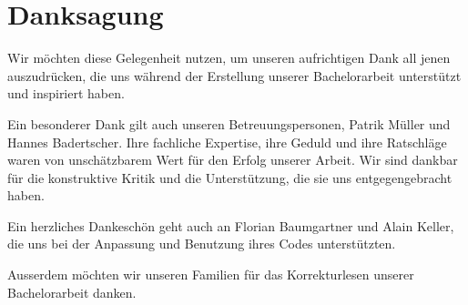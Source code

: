 %
%
%

\chapter*{Danksagung}

Wir möchten diese Gelegenheit nutzen, um unseren aufrichtigen Dank all jenen auszudrücken, die uns während der Erstellung unserer Bachelorarbeit unterstützt und inspiriert haben.
\vspace{11pt}

\noindent
Ein besonderer Dank gilt auch unseren Betreuungspersonen, Patrik Müller und Hannes Badertscher.
Ihre fachliche Expertise, ihre Geduld und ihre Ratschläge waren von unschätzbarem Wert für den Erfolg unserer Arbeit.
Wir sind dankbar für die konstruktive Kritik und die Unterstützung, die sie uns entgegengebracht haben.
\vspace{11pt}

\noindent 
Ein herzliches Dankeschön geht auch an Florian Baumgartner und Alain Keller, die uns bei der Anpassung und Benutzung ihres Codes unterstützten. 
\vspace{11pt}

\noindent
Ausserdem möchten wir unseren Familien für das Korrekturlesen unserer Bachelorarbeit danken. 